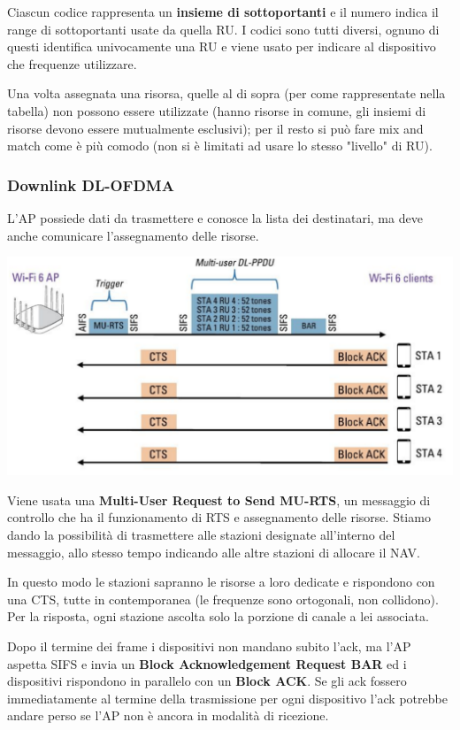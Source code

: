 Ciascun codice rappresenta un \textbf{insieme di sottoportanti} e il numero indica il range di sottoportanti usate da quella RU. I codici sono tutti diversi, ognuno di questi identifica univocamente una RU e viene usato per indicare al dispositivo che frequenze utilizzare.

Una volta assegnata una risorsa, quelle al di sopra (per come rappresentate nella tabella) non possono essere utilizzate (hanno risorse in comune, gli insiemi di risorse devono essere mutualmente esclusivi); per il resto si può fare mix and match come è più comodo (non si è limitati ad usare lo stesso "livello" di RU).

\subsubsection{Downlink DL-OFDMA}

L'AP possiede dati da trasmettere e conosce la lista dei destinatari, ma deve anche comunicare l'assegnamento delle risorse. 
\begin{center}
	\includegraphics[width=0.95\linewidth]{img/wlan/downlink}
\end{center}

Viene usata una \textbf{Multi-User Request to Send MU-RTS}, un messaggio di controllo che ha il funzionamento di RTS e assegnamento delle risorse. Stiamo dando la possibilità di trasmettere alle stazioni designate all'interno del messaggio, allo stesso tempo indicando alle altre stazioni di allocare il NAV.

In questo modo le stazioni sapranno le risorse a loro dedicate e rispondono con una CTS, tutte in contemporanea (le frequenze sono ortogonali, non collidono). Per la risposta, ogni stazione ascolta solo la porzione di canale a lei associata.


Dopo il termine dei frame i dispositivi non mandano subito l'ack, ma l'AP aspetta SIFS e invia un \textbf{Block Acknowledgement Request BAR} ed i dispositivi rispondono in parallelo con un \textbf{Block ACK}.
Se gli ack fossero immediatamente al termine della trasmissione per ogni dispositivo l'ack potrebbe andare perso se l'AP non è ancora in modalità di ricezione.

